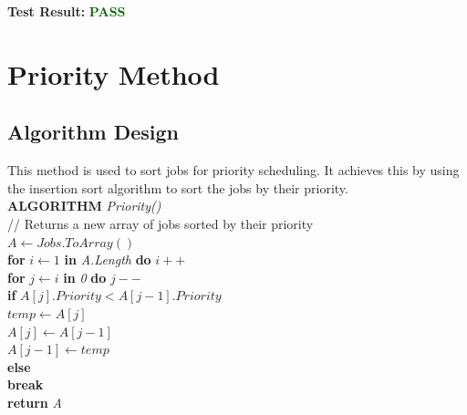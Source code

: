 \documentclass[12pt,a4paper]{article}
\begin{document}
			\textbf{Test Result:} \textbf{\textcolor{darkgreen}{PASS}}\\

	\newpage
	\section{Priority Method}
		\subsection{Algorithm Design}
			This method is used to sort jobs for priority scheduling. It achieves this by using the 
			insertion sort algorithm to sort the jobs by their priority.\\
			
			\textbf{ALGORITHM} \textit{Priority()}\\
			\null\hspace{1cm}// Returns a new array of jobs sorted by their priority\\
			\null\hspace{1cm}\textit{$A \gets Jobs.ToArray()$}\\
			\null\hspace{1cm}\textbf{for} \textit{$i \gets 1$} \textbf{in} \textit{A.Length} \textbf{do} \textit{$i++$}\\
			\null\hspace{2cm}\textbf{for} \textit{$j \gets i$} \textbf{in} \textit{0} \textbf{do} \textit{$j--$}\\
			\null\hspace{3cm}\textbf{if} \textit{$A[j].Priority < A[j - 1].Priority$}\\
			\null\hspace{4cm}\textit{$temp \gets A[j]$}\\
			\null\hspace{4cm}\textit{$A[j] \gets A[j - 1]$}\\
			\null\hspace{4cm}\textit{$A[j - 1] \gets temp$}\\
			\null\hspace{3cm}\textbf{else}\\
			\null\hspace{4cm}\textbf{break}\\
			\null\hspace{1cm}\textbf{return} \textit{A}\\
		
\end{document}
